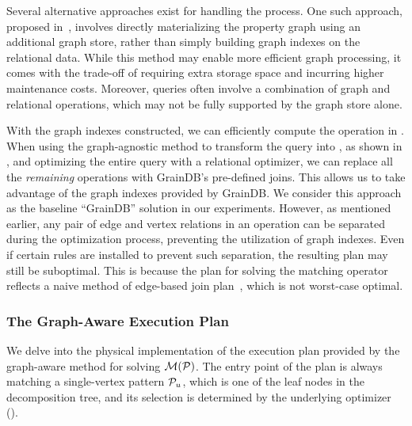 \begin{remark}
  Several alternative approaches exist for handling the \rgmapping process. One such approach, proposed in~\cite{gart}, involves directly materializing the property graph using an additional graph store, rather than simply building graph indexes on the relational data. While this method may enable more efficient graph processing, it comes with the trade-off of requiring extra storage space and incurring higher maintenance costs. Moreover, \spjm queries often involve a combination of graph and relational operations, which may not be fully supported by the graph store alone.
\end{remark}

With the graph indexes constructed, we can efficiently compute the \EVjoin operation in .
When using the graph-agnostic method to transform the \spjm query into \spj, as shown in , and optimizing the entire \spj query with a relational optimizer, we can replace all the \emph{remaining} \EVjoin operations with GrainDB's pre-defined joins. This allows us to take advantage of the graph indexes provided by GrainDB. We consider this approach as the baseline ``GrainDB'' solution in our experiments.
However, as mentioned earlier, any pair of edge and vertex relations in an \EVjoin operation can be separated during the optimization process, preventing the utilization of graph indexes. 
Even if certain rules are installed to prevent such separation, the resulting plan may still be suboptimal. This is because the plan for solving the matching operator reflects a naive method of edge-based join plan~\cite{lai2019distributed}, which is not worst-case optimal. 

\subsubsection{The Graph-Aware Execution Plan}
\label{sec:join-matching-operator}
We delve into the physical implementation of the execution plan provided by the graph-aware method for solving $\mathcal{M}(\mathcal{P})$. The entry point of the plan is always matching a single-vertex pattern $\mathcal{P}_u$, which is one of the leaf nodes in the decomposition tree, and its selection is determined by the underlying optimizer ().

